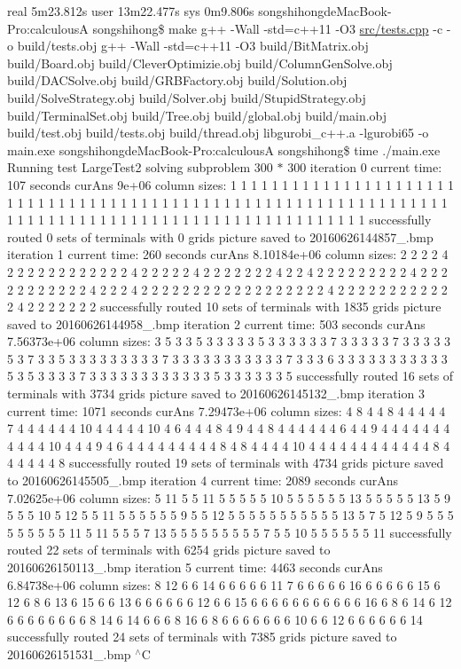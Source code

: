 real 5m23.\+812s user 13m22.\+477s sys 0m9.\+806s songshihongde\+Mac\+Book-\/\+Pro\+:calculousA songshihong\$ make g++ -\/\+Wall -\/std=c++11 -\/\+O3 \hyperlink{tests_8cpp}{src/tests.\+cpp} -\/c -\/o build/tests.\+obj g++ -\/\+Wall -\/std=c++11 -\/\+O3 build/\+Bit\+Matrix.\+obj build/\+Board.\+obj build/\+Clever\+Optimizie.\+obj build/\+Column\+Gen\+Solve.\+obj build/\+D\+A\+C\+Solve.\+obj build/\+G\+R\+B\+Factory.\+obj build/\+Solution.\+obj build/\+Solve\+Strategy.\+obj build/\+Solver.\+obj build/\+Stupid\+Strategy.\+obj build/\+Terminal\+Set.\+obj build/\+Tree.\+obj build/global.\+obj build/main.\+obj build/test.\+obj build/tests.\+obj build/thread.\+obj libgurobi\+\_\+c++.a -\/lgurobi65 -\/o main.\+exe songshihongde\+Mac\+Book-\/\+Pro\+:calculousA songshihong\$ time ./main.exe Running test Large\+Test2 solving subproblem 300 $\ast$ 300 iteration 0 current time\+: 107 seconds cur\+Ans 9e+06 column sizes\+: 1 1 1 1 1 1 1 1 1 1 1 1 1 1 1 1 1 1 1 1 1 1 1 1 1 1 1 1 1 1 1 1 1 1 1 1 1 1 1 1 1 1 1 1 1 1 1 1 1 1 1 1 1 1 1 1 1 1 1 1 1 1 1 1 1 1 1 1 1 1 1 1 1 1 1 1 1 1 1 1 1 1 1 1 1 1 1 1 1 1 1 1 1 1 1 1 1 1 1 1 successfully routed 0 sets of terminals with 0 grids picture saved to 20160626144857\+\_.\+bmp iteration 1 current time\+: 260 seconds cur\+Ans 8.\+10184e+06 column sizes\+: 2 2 2 2 4 2 2 2 2 2 2 2 2 2 2 2 2 4 2 2 2 2 2 4 2 2 2 2 2 2 2 4 2 2 4 2 2 2 2 2 2 2 2 2 4 2 2 2 2 2 2 2 2 2 2 2 4 2 2 2 4 2 2 2 2 2 2 2 2 2 2 2 2 2 2 2 2 2 2 4 2 2 2 2 2 2 2 2 2 2 2 2 4 2 2 2 2 2 2 2 successfully routed 10 sets of terminals with 1835 grids picture saved to 20160626144958\+\_.\+bmp iteration 2 current time\+: 503 seconds cur\+Ans 7.\+56373e+06 column sizes\+: 3 5 3 3 5 3 3 3 3 3 5 3 3 3 3 3 3 7 3 3 3 3 3 7 3 3 3 3 3 5 3 7 3 3 5 3 3 3 3 3 3 3 3 3 7 3 3 3 3 3 3 3 3 3 3 3 7 3 3 3 6 3 3 3 3 3 3 3 3 3 3 3 5 3 5 3 3 3 3 7 3 3 3 3 3 3 3 3 3 3 3 3 5 3 3 3 3 3 3 5 successfully routed 16 sets of terminals with 3734 grids picture saved to 20160626145132\+\_.\+bmp iteration 3 current time\+: 1071 seconds cur\+Ans 7.\+29473e+06 column sizes\+: 4 8 4 4 8 4 4 4 4 4 7 4 4 4 4 4 4 10 4 4 4 4 4 10 4 6 4 4 4 8 4 9 4 4 8 4 4 4 4 4 4 6 4 4 9 4 4 4 4 4 4 4 4 4 4 4 10 4 4 4 9 4 6 4 4 4 4 4 4 4 4 4 8 4 8 4 4 4 4 10 4 4 4 4 4 4 4 4 4 4 4 4 8 4 4 4 4 4 4 8 successfully routed 19 sets of terminals with 4734 grids picture saved to 20160626145505\+\_.\+bmp iteration 4 current time\+: 2089 seconds cur\+Ans 7.\+02625e+06 column sizes\+: 5 11 5 5 11 5 5 5 5 5 10 5 5 5 5 5 5 13 5 5 5 5 5 13 5 9 5 5 5 10 5 12 5 5 11 5 5 5 5 5 5 9 5 5 12 5 5 5 5 5 5 5 5 5 5 5 13 5 7 5 12 5 9 5 5 5 5 5 5 5 5 5 11 5 11 5 5 5 7 13 5 5 5 5 5 5 5 5 5 7 5 5 10 5 5 5 5 5 5 11 successfully routed 22 sets of terminals with 6254 grids picture saved to 20160626150113\+\_.\+bmp iteration 5 current time\+: 4463 seconds cur\+Ans 6.\+84738e+06 column sizes\+: 8 12 6 6 14 6 6 6 6 6 11 7 6 6 6 6 6 16 6 6 6 6 6 15 6 12 6 8 6 13 6 15 6 6 13 6 6 6 6 6 6 12 6 6 15 6 6 6 6 6 6 6 6 6 6 6 16 6 8 6 14 6 12 6 6 6 6 6 6 6 6 8 14 6 14 6 6 6 8 16 6 8 6 6 6 6 6 6 6 10 6 6 12 6 6 6 6 6 6 14 successfully routed 24 sets of terminals with 7385 grids picture saved to 20160626151531\+\_.\+bmp $^\wedge$C

